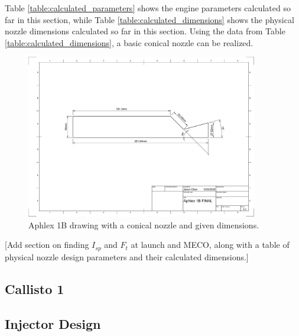 \documentclass[9pt]{article} %
\numberwithin{equation}{section} %
\begin{document}
Table \ref{table:calculated_parameters} shows the engine parameters calculated so far in this section, while Table \ref{table:calculated_dimensions} shows the physical nozzle dimensions calculated so far in this section. Using the data from Table \ref{table:calculated_dimensions}, a basic conical nozzle can be realized.

\begin{figure}
\centering
\includegraphics[scale=0.5, width=0.9\textwidth, trim={6.5cm 12.5cm 5.5cm 9cm}, clip]{aphlex1b-drawing} %
\caption{Aphlex 1B drawing with a conical nozzle and given dimensions.}
\label{fig:conical_nozzle_drawing}
\end{figure}

[Add section on finding $I_{sp}$ and $F_{t}$ at launch and MECO, along with a table of physical nozzle design parameters and their calculated dimensions.]

\subsection{Callisto 1}

\subsection{Injector Design}
\end{document}
